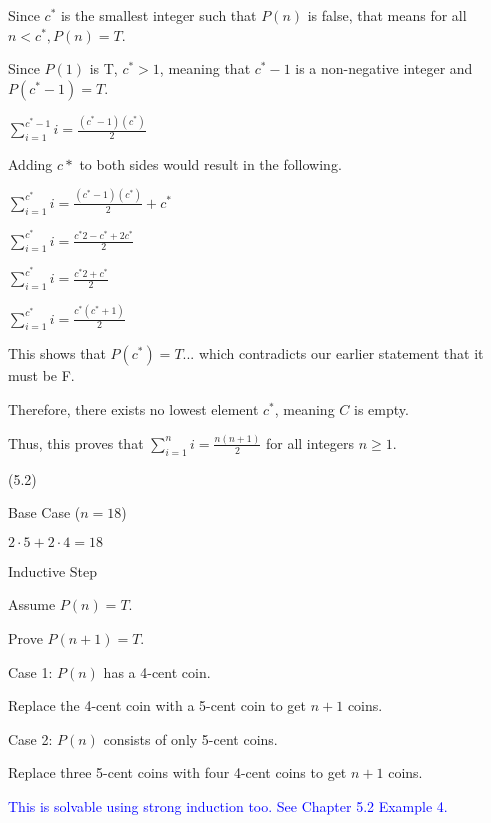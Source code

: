 \documentclass{exam}
\begin{document}
\begin{questions}
\begin{center}
Since \(c^*\) is the smallest integer such that \(P(n)\) is false, that means for all \(n < c^*, P(n) = T\).

Since \(P(1)\) is T, \(c^* > 1\), meaning that \(c^*-1\) is a non-negative integer and \(P(c^*-1) = T\).

\( \sum_{i=1}^{c^*-1} i = \frac{(c^*-1)(c^*)}{2} \)

Adding \(c*\) to both sides would result in the following.

\( \sum_{i=1}^{c^*} i = \frac{(c^*-1)(c^*)}{2} + c^* \)

\( \sum_{i=1}^{c^*} i = \frac{c^*2 - c^* + 2c^*}{2} \)

\( \sum_{i=1}^{c^*} i = \frac{c^*2 + c^*}{2} \)

\( \sum_{i=1}^{c^*} i = \frac{c^*(c^* + 1)}{2} \)

This shows that \(P(c^*) = T\)... which contradicts our earlier statement that it must be F.

Therefore, there exists no lowest element \(c^*\), meaning \(C\) is empty.

Thus, this proves that \( \sum_{i=1}^{n} i = \frac{n(n+1)}{2} \) for all integers \( n \geq 1 \).

\end{center}

 (5.2)

\begin{center}
Base Case (\(n = 18\))

\( 2 \cdot 5 + 2 \cdot 4 = 18 \)

\vspace{5px}

Inductive Step

Assume \( P(n) = T \).

Prove \( P(n+1) = T \).

Case 1: \(P(n)\) has a 4-cent coin.

Replace the 4-cent coin with a 5-cent coin to get \(n+1\) coins.
\vspace{5px}

Case 2: \(P(n)\) consists of only 5-cent coins.

Replace three 5-cent coins with four 4-cent coins to get \(n+1\) coins.

\textcolor{blue}{This is solvable using strong induction too. See Chapter 5.2 Example 4.}

\end{center}


\end{questions}
\end{document}
